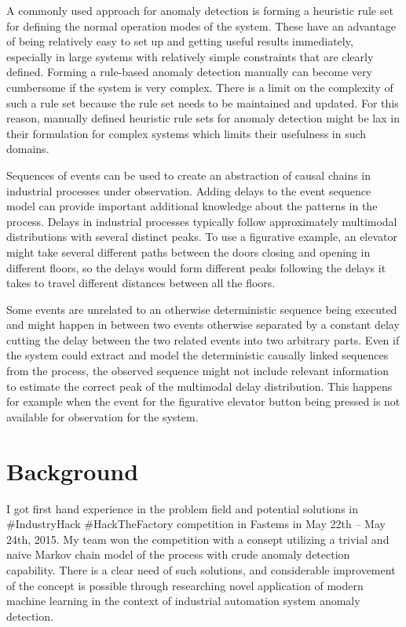 \documentclass[a4paper,10pt]{article}
\begin{document}
A commonly used approach for anomaly detection is forming a heuristic rule set for defining the normal operation modes of the system. These have an advantage of being
relatively easy
to set up and getting useful results immediately, especially in large systems with relatively simple constraints that are clearly defined.
Forming a rule-based anomaly detection manually can become very cumbersome if the system is very complex. There is a limit on the complexity of such a rule set because
the rule set needs to be maintained and updated. For this reason, manually defined heuristic rule sets for anomaly detection might be lax in their formulation
for complex systems which limits their usefulness in such domains.

Sequences of events can be used to create an abstraction of causal chains in industrial processes under observation. Adding delays to the event sequence model can provide important
additional knowledge about the patterns in the process. Delays in industrial processes typically follow approximately multimodal distributions with several distinct peaks.
To use a figurative example, an elevator might take several different paths between the doors closing and opening in different floors, so the delays would form different
peaks following the delays it takes to travel different distances between all the floors.

Some events are unrelated to an otherwise deterministic sequence being executed
and might happen in between two events otherwise separated by a constant delay cutting the delay between the two related events into two arbitrary parts.
Even if the system could extract and model the deterministic causally linked sequences from the process,
the observed sequence might not include relevant information to estimate the correct peak of the multimodal delay distribution.
This happens for example when the event for the figurative elevator button being pressed is not available for observation for the system.

\section{Background}

I got first hand experience in the problem field and potential solutions in \#IndustryHack \#HackTheFactory competition in Fastems in May 22th – May 24th, 2015\cite{IndustryHack}.
My team won the competition with a consept utilizing a trivial and naive Markov chain model of the process with crude anomaly detection capability.
There is a clear need of such solutions, and considerable improvement of the concept is possible through researching novel application of modern machine learning in the context
of industrial automation system anomaly detection.
\end{document}
